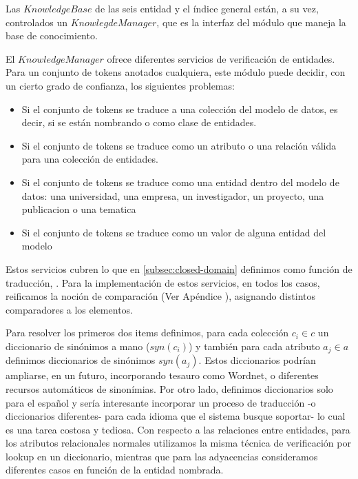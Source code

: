Las $KnowledgeBase$ de las seis entidad y el índice general están, a su vez, controlados un $KnowlegdeManager$, que es la interfaz del módulo que maneja la base de conocimiento. 

El $KnowledgeManager$ ofrece diferentes servicios de verificación de entidades. Para un conjunto de tokens {\color{red}anotados} cualquiera, este módulo puede decidir, con un cierto grado de confianza, los siguientes problemas:

\begin{itemize}
  \item Si el conjunto de tokens se traduce a una colección del modelo de datos, es decir, si se están nombrando  o  como clase de entidades.
  \item Si el conjunto de tokens se traduce como un atributo o una relación válida para una colección de entidades.
  \item Si el conjunto de tokens se traduce como una entidad dentro del modelo de datos: una universidad, una empresa, un investigador, un proyecto, una publicacion o una tematica
  \item Si el conjunto de tokens se traduce como un valor de alguna entidad del modelo
\end{itemize}

Estos servicios cubren lo que en \ref{subsec:closed-domain} definimos como función de traducción, \tradqd  . Para la implementación de estos servicios, en todos los casos, reificamos la noción de comparación (Ver Apéndice ), asignando distintos comparadores a los elementos. 

Para resolver los primeros dos items definimos, para cada colección $c_i \in c$ un diccionario de sinónimos a mano ($syn(c_i)$) y también para cada atributo $a_j \in a$ definimos diccionarios de sinónimos $syn(a_j)$. Estos diccionarios podrían ampliarse, en un futuro, incorporando tesauro como Wordnet, o diferentes recursos automáticos de sinonímias. Por otro lado, definimos diccionarios solo para el español y sería interesante incorporar un proceso de traducción -o diccionarios diferentes- para cada idioma que el sistema busque soportar- lo cual es una tarea costosa y tediosa. Con respecto a las relaciones entre entidades, para los atributos relacionales normales utilizamos la misma técnica de verificación por lookup en un diccionario, mientras que para las adyacencias consideramos diferentes casos en función de la entidad nombrada.

